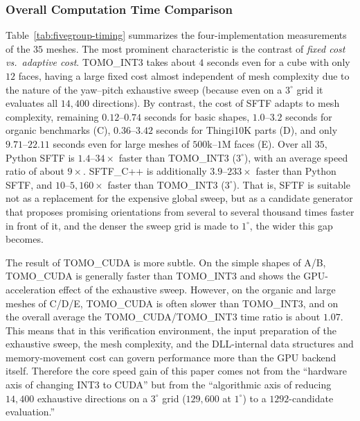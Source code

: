 \documentclass[11pt,a4paper]{article}
\begin{document}
\subsubsection{Overall Computation Time Comparison}

Table~\ref{tab:fivegroup-timing} summarizes the four-implementation measurements of the $35$ meshes.
The most prominent characteristic is the contrast of \emph{fixed cost vs.\ adaptive cost}.
TOMO\_INT3 takes about $4$ seconds even for a cube with only $12$ faces,
having a large fixed cost almost independent of mesh complexity due to the nature of the yaw--pitch exhaustive sweep (because even on a $3^\circ$ grid it evaluates all $14{,}400$ directions).
By contrast, the cost of SFTF adapts to mesh complexity,
remaining $0.12$--$0.74$ seconds for basic shapes, $1.0$--$3.2$ seconds for organic benchmarks (C),
$0.36$--$3.42$ seconds for Thingi10K parts (D), and only $9.71$--$22.11$ seconds even for large meshes of $500$k--$1$M faces (E).
Over all $35$, Python SFTF is $1.4$--$34\times$ faster than TOMO\_INT3 ($3^\circ$),
with an average speed ratio of about $9\times$.
SFTF\_C++ is additionally $3.9$--$233\times$ faster than Python SFTF,
and $10$--$5{,}160\times$ faster than TOMO\_INT3 ($3^\circ$).
That is, SFTF is suitable not as a replacement for the expensive global sweep, but
as a candidate generator that proposes promising orientations from several to several thousand times faster in front of it,
and the denser the sweep grid is made to $1^\circ$, the wider this gap becomes.

The result of TOMO\_CUDA is more subtle.
On the simple shapes of A/B, TOMO\_CUDA is generally faster than TOMO\_INT3
and shows the GPU-acceleration effect of the exhaustive sweep.
However, on the organic and large meshes of C/D/E, TOMO\_CUDA is often slower than TOMO\_INT3,
and on the overall average the TOMO\_CUDA/TOMO\_INT3 time ratio is about $1.07$.
This means that in this verification environment, the input preparation of the exhaustive sweep, the mesh complexity,
and the DLL-internal data structures and memory-movement cost can govern performance more than the GPU backend itself.
Therefore the core speed gain of this paper comes not from the ``hardware axis of changing INT3 to CUDA''
but from the ``algorithmic axis of reducing $14{,}400$ exhaustive directions on a $3^\circ$ grid ($129{,}600$ at $1^\circ$) to a $1292$-candidate evaluation.''
\end{document}
